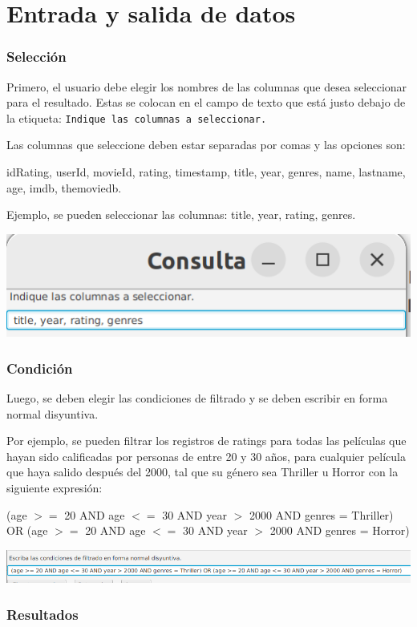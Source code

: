 \documentclass{beamer}
\begin{document}
\section{Entrada y salida de datos}

\begin{frame}
\frametitle{Selección}

Primero, el usuario debe elegir los nombres de las columnas que desea seleccionar para el resultado. Estas se colocan en el campo de texto que está justo debajo de la etiqueta: \texttt{Indique las columnas a seleccionar.}

Las columnas que seleccione deben estar separadas por comas y las opciones son:

idRating, userId, movieId, rating, timestamp, title, year, genres, name, lastname, age, imdb, themoviedb.

\pause

Ejemplo, se pueden seleccionar las columnas: title, year, rating, genres.

\begin{center}
\includegraphics[scale=0.5]{seleccion}
\end{center}

\end{frame}

\begin{frame}
\frametitle{Condición}

Luego, se deben elegir las condiciones de filtrado y se deben escribir en forma normal disyuntiva.

Por ejemplo, se pueden filtrar los registros de ratings para todas las películas que hayan sido calificadas por personas de entre 20 y 30 años, para cualquier película que haya salido después del 2000, tal que su género sea Thriller u Horror con la siguiente expresión:

\pause

(age $>=$ 20 AND age $<=$ 30 AND year $>$ 2000 AND genres = Thriller) OR (age $>=$ 20 AND age $<=$ 30 AND year $>$ 2000 AND genres = Horror)

\begin{center}
\includegraphics[scale=0.3]{condicion}
\end{center}

\end{frame}

\begin{frame}
\frametitle{Resultados}



\end{frame}
\end{document}

